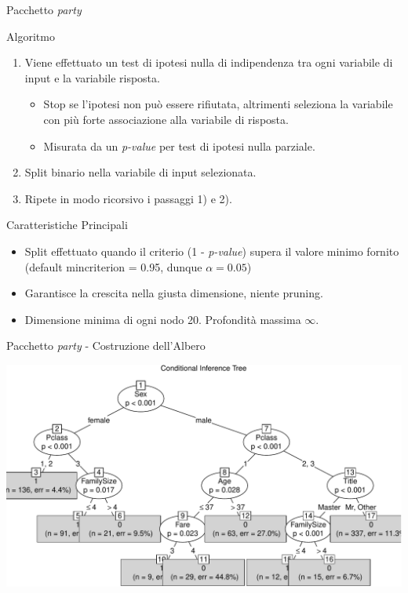 \documentclass[9pt, xcolor=table]{beamer}
\begin{document}
	\begin{frame}{Pacchetto \textit{party}}		
		\begin{block}{Algoritmo}
			\begin{enumerate}
				\item Viene effettuato un test di ipotesi nulla di indipendenza tra ogni variabile di input e la variabile risposta.
				\begin{itemize}
					\item Stop se l'ipotesi non può essere rifiutata, altrimenti seleziona la variabile con più forte associazione alla variabile di risposta.
					\item Misurata da un \textit{p-value} per test di ipotesi nulla parziale.
				\end{itemize}
				\item Split binario nella variabile di input selezionata.
				\item Ripete in modo ricorsivo i passaggi 1) e 2).
			\end{enumerate}
		\end{block}
	
		\begin{block}{Caratteristiche Principali}
			\begin{itemize}
				\item Split effettuato quando il criterio (1 - \textit{p-value}) supera il valore minimo fornito (default mincriterion = 0.95, dunque $\alpha=0.05$)
				\item Garantisce la crescita nella giusta dimensione, niente pruning.
				\item Dimensione minima di ogni nodo 20. Profondità massima $\infty$.
			\end{itemize}
		\end{block}	
	\end{frame}

	\begin{frame}{Pacchetto \textit{party} - Costruzione dell'Albero}
		
		
		\vfill
		
		\centering
		\includegraphics[scale=0.48]{party-tree}
	\end{frame}
\end{document}
